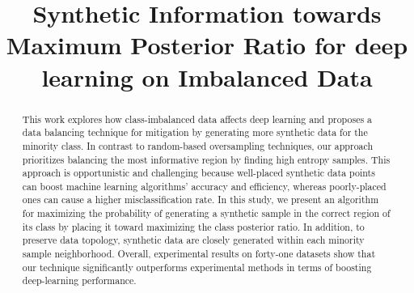 \documentclass[journal]{IEEEtai}
\newcommand{\MethodnameLong}{Synthetic Information towards Maximum Posterior Ratio}
\begin{document}
\title{\MethodnameLong{} for deep learning on Imbalanced Data\\}

\author{
	}


\maketitle
\thispagestyle{plain}
\pagestyle{plain}

\linenumbers
\begin{abstract}

	This work explores how class-imbalanced data affects deep learning and proposes a data balancing technique for mitigation by generating more synthetic data for the minority class. In contrast to random-based oversampling techniques, our approach prioritizes balancing the most informative region by finding high entropy samples. This approach is opportunistic and challenging because well-placed synthetic data points can boost machine learning algorithms' accuracy and efficiency, whereas poorly-placed ones can cause a higher misclassification rate. In this study, we present an algorithm for maximizing the probability of generating a synthetic sample in the correct region of its class by placing it toward maximizing the class posterior ratio. In addition, to preserve data topology, synthetic data are closely generated within each minority sample neighborhood. Overall, experimental results on forty-one datasets show that our technique significantly outperforms experimental methods in terms of boosting deep-learning performance. 
\end{abstract}
\end{document}
